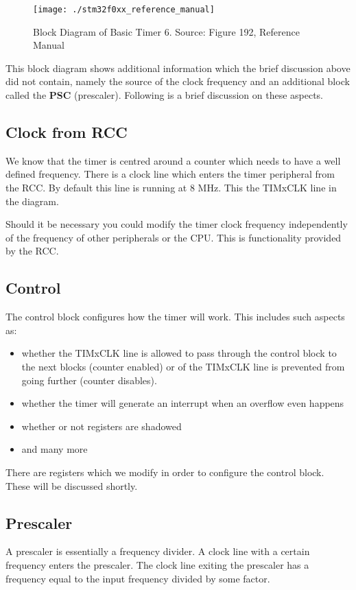 \begin{figure}
\centering
\texttt{[image: ./stm32f0xx\_reference\_manual]}
\caption{Block Diagram of Basic Timer 6. Source: Figure 192, Reference Manual}
\label{fig:timer_basic_diagram}
\end{figure}

This block diagram shows additional information which the brief discussion above did not contain, namely the source of the clock frequency and an additional block called the \textbf{PSC} (prescaler). Following is a brief discussion on these aspects.

\subsection{Clock from RCC}
We know that the timer is centred around a counter which needs to have a well defined frequency. There is a clock line which enters the timer peripheral from the RCC. By default this line is running at 8 MHz. This the TIMxCLK line in the diagram. 

Should it be necessary you could modify the timer clock frequency independently of the frequency of other peripherals or the CPU. 
This is functionality provided by the RCC. 

\subsection{Control}
The control block configures how the timer will work. This includes such aspects as:
\begin{itemize}
\item whether the TIMxCLK line is allowed to pass through the control block to the next blocks (counter enabled) or of the TIMxCLK line is prevented from going further (counter disables).
\item whether the timer will generate an interrupt when an overflow even happens
\item whether or not registers are shadowed
\item and many more
\end{itemize}

There are registers which we modify in order to configure the control block. These will be discussed shortly. 

\subsection{Prescaler}
A prescaler is essentially a frequency divider. A clock line with a certain frequency enters the prescaler. The clock line exiting the prescaler has a frequency equal to the input frequency divided by some factor. 

